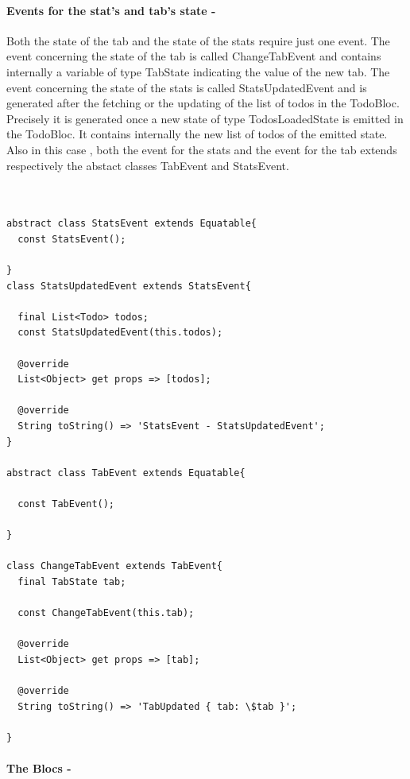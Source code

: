 \paragraph{Events for the stat’s and tab’s state - }
\label{subpar:todo_app_bloc_core_state}

Both the state of the tab and the state of the stats require just one event. The event concerning the state of the tab is called ChangeTabEvent and contains internally a variable of type TabState indicating the value of the new tab. The event concerning the state of the stats is called StatsUpdatedEvent and is generated after the fetching or the updating of the list of todos in the TodoBloc. Precisely it is generated once a new state of type TodosLoadedState is emitted in the TodoBloc. It contains internally the new list of todos of the emitted state. \\
Also in this case , both the event for the stats and the event for the tab extends respectively the abstact classes TabEvent and StatsEvent.

\begin{code}
\mbox{}
 \mbox{}
\label{code:2.14}
\begin{verbatim}


abstract class StatsEvent extends Equatable{
  const StatsEvent();

}
class StatsUpdatedEvent extends StatsEvent{

  final List<Todo> todos;
  const StatsUpdatedEvent(this.todos);

  @override
  List<Object> get props => [todos];

  @override
  String toString() => 'StatsEvent - StatsUpdatedEvent';
}

abstract class TabEvent extends Equatable{

  const TabEvent();

}

class ChangeTabEvent extends TabEvent{
  final TabState tab;

  const ChangeTabEvent(this.tab);

  @override
  List<Object> get props => [tab];

  @override
  String toString() => 'TabUpdated { tab: \$tab }';

}
\end{verbatim}
\mbox{}
\end{code}

\paragraph{The Blocs - }
\label{subpar:todo_app_bloc_core_state}

